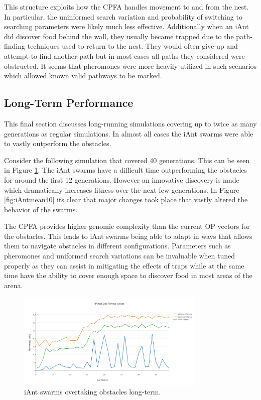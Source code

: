 \documentclass{acm_proc_article-sp}
\begin{document}
This structure exploits how the CPFA handles movement to and from the nest. In particular, the uninformed search variation and probability of switching to searching parameters were likely much less effective. Additionally when an iAnt did discover food behind the wall, they usually became trapped due to the path-finding techniques used to return to the nest. They would often give-up and attempt to find another path but in most cases all paths they considered were obstructed. It seems that pheromones were more heavily utilized in such scenarios which allowed known valid pathways to be marked. 



\subsection{Long-Term Performance} \label{sec:obstacles}

This final section discusses long-running simulations covering up to twice as many generations as regular simulations. In almost all cases the iAnt swarms were able to vastly outperform the obstacles.

Consider the following simulation that covered 40 generations. This can be seen in Figure \ref{fig:iAntfitness40}. The iAnt swarms have a difficult time outperforming the obstacles for around the first 12 generations. However an innovative discovery is made which dramatically increases fitness over the next few generations. In Figure \ref{fig:iAntmean40} its clear that major changes took place that vastly altered the behavior of the swarms.

The CPFA provides higher genomic complexity than the current OP vectors for the obstacles. This leads to iAnt swarms being able to adapt in ways that allows them to navigate obstacles in different configurations. Parameters such as pheromones and uniformed search variations can be invaluable when tuned properly as they can assist in mitigating the effects of traps while at the same time have the ability to cover enough space to discover food in most areas of the arena.

\begin{figure}[h]
	\includegraphics[width=9cm]{images/iAntsEliteFitnessValues40}
	\caption{iAnt swarms overtaking obstacles long-term.} 
	\label{fig:iAntfitness40}
\end{figure}
\end{document}
